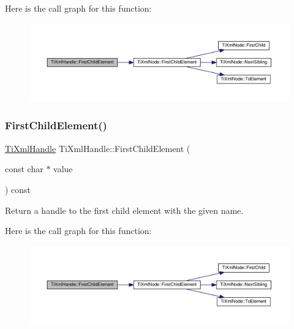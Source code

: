 Here is the call graph for this function\+:\nopagebreak
\begin{figure}[H]
\begin{center}
\leavevmode
\includegraphics[width=350pt]{class_ti_xml_handle_af0643f8683f3f2b779b8c9d78c67b2c0_cgraph}
\end{center}
\end{figure}
\mbox{\label{class_ti_xml_handle_a3eaf2d2d4c087cd8a48da261042e75bc}} 
\subsubsection{\texorpdfstring{First\+Child\+Element()}{FirstChildElement()}\hspace{0.1cm}{\footnotesize\ttfamily [2/2]}}
{\footnotesize\ttfamily \hyperlink{class_ti_xml_handle}{Ti\+Xml\+Handle} Ti\+Xml\+Handle\+::\+First\+Child\+Element (\begin{DoxyParamCaption}\item[{const char $\ast$}]{value }\end{DoxyParamCaption}) const}



Return a handle to the first child element with the given name. 

Here is the call graph for this function\+:\nopagebreak
\begin{figure}[H]
\begin{center}
\leavevmode
\includegraphics[width=350pt]{class_ti_xml_handle_a3eaf2d2d4c087cd8a48da261042e75bc_cgraph}
\end{center}
\end{figure}
\mbox{\label{class_ti_xml_handle_aec0e3ea58ff98a45cd13507a02e2ca1e}} 
